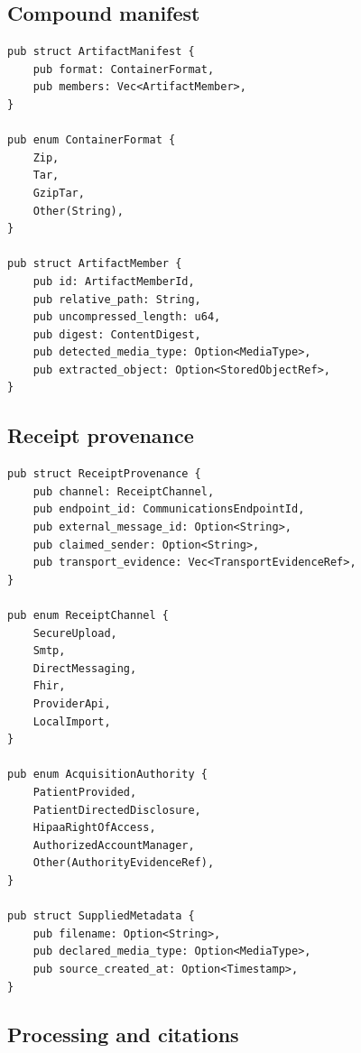 \documentclass[11pt]{article}
\begin{document}
\Needspace{0.45\textheight}
\subsection{Compound manifest}

\begin{lstlisting}
pub struct ArtifactManifest {
    pub format: ContainerFormat,
    pub members: Vec<ArtifactMember>,
}

pub enum ContainerFormat {
    Zip,
    Tar,
    GzipTar,
    Other(String),
}

pub struct ArtifactMember {
    pub id: ArtifactMemberId,
    pub relative_path: String,
    pub uncompressed_length: u64,
    pub digest: ContentDigest,
    pub detected_media_type: Option<MediaType>,
    pub extracted_object: Option<StoredObjectRef>,
}
\end{lstlisting}

\Needspace{0.5\textheight}
\subsection{Receipt provenance}

\begin{lstlisting}
pub struct ReceiptProvenance {
    pub channel: ReceiptChannel,
    pub endpoint_id: CommunicationsEndpointId,
    pub external_message_id: Option<String>,
    pub claimed_sender: Option<String>,
    pub transport_evidence: Vec<TransportEvidenceRef>,
}

pub enum ReceiptChannel {
    SecureUpload,
    Smtp,
    DirectMessaging,
    Fhir,
    ProviderApi,
    LocalImport,
}

pub enum AcquisitionAuthority {
    PatientProvided,
    PatientDirectedDisclosure,
    HipaaRightOfAccess,
    AuthorizedAccountManager,
    Other(AuthorityEvidenceRef),
}

pub struct SuppliedMetadata {
    pub filename: Option<String>,
    pub declared_media_type: Option<MediaType>,
    pub source_created_at: Option<Timestamp>,
}
\end{lstlisting}

\Needspace{0.55\textheight}
\subsection{Processing and citations}
\end{document}
